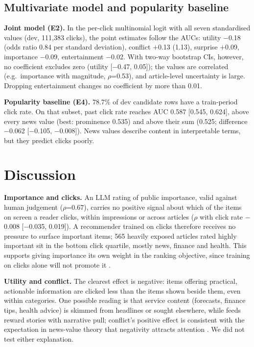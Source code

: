 \subsection{Multivariate model and popularity baseline}
\textbf{Joint model (E2).} In the per-click multinomial logit with all seven standardised values (dev, 111,383 clicks), the point estimates follow the AUCs: utility $-$0.18 (odds ratio 0.84 per standard deviation), conflict $+$0.13 (1.13), surprise $+$0.09, importance $-$0.09, entertainment $-$0.02. With two-way bootstrap CIs, however, no coefficient excludes zero (utility [$-$0.47, 0.05]); the values are correlated (e.g.\ importance with magnitude, $\rho$=0.53), and article-level uncertainty is large. Dropping entertainment changes no coefficient by more than 0.01.

\textbf{Popularity baseline (E4).} 78.7\% of dev candidate rows have a train-period click rate. On that subset, past click rate reaches AUC 0.587 [0.545, 0.624], above every news value (best: prominence 0.535) and above their sum (0.525; difference $-$0.062 [$-$0.105, $-$0.008]). News values describe content in interpretable terms, but they predict clicks poorly.

\section{Discussion}
\textbf{Importance and clicks.} An LLM rating of public importance, valid against human judgement ($\rho$=0.67), carries no positive signal about which of the items on screen a reader clicks, within impressions or across articles ($\rho$ with click rate $-$0.008 [$-$0.035, 0.019]). A recommender trained on clicks therefore receives no pressure to surface important items; 565 heavily exposed articles rated highly important sit in the bottom click quartile, mostly news, finance and health. This supports giving importance its own weight in the ranking objective, since training on clicks alone will not promote it \cite{meese2025,vrijenhoek2023}.

\textbf{Utility and conflict.} The clearest effect is negative: items offering practical, actionable information are clicked less than the items shown beside them, even within categories. One possible reading is that service content (forecasts, finance tips, health advice) is skimmed from headlines or sought elsewhere, while feeds reward stories with narrative pull; conflict's positive effect is consistent with the expectation in news-value theory that negativity attracts attention \cite{galtung1965,harcup2017}. We did not test either explanation.

